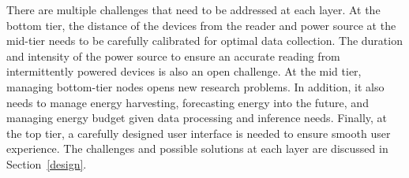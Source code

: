 
There are multiple challenges that need to be addressed at each layer. At the bottom tier, the distance of the devices from the reader and power source at the mid-tier needs to be carefully calibrated for optimal data collection. The duration and intensity of the power source to ensure an accurate reading from intermittently powered devices is also an open challenge. At the mid tier, managing bottom-tier nodes opens new research problems. In addition, it also needs to manage energy harvesting, forecasting energy into the future, and managing energy budget given data processing and inference needs. Finally, at the top tier, a carefully designed user interface is needed to ensure smooth user experience. The challenges and possible solutions at each layer are discussed in Section~\ref{design}. 




